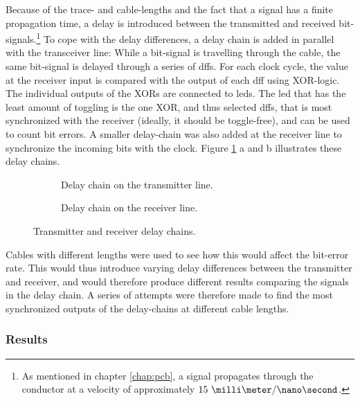 \documentclass[main.tex]{subfiles}
\begin{document}
Because of the trace- and cable-lengths and the fact that a signal has a finite propagation time, a delay is introduced between the transmitted and received bit-signals.\footnote{As mentioned in chapter \ref{chap:pcb}, a signal propagates through the conductor at a velocity of approximately $15\ \milli\meter/\nano\second$.} To cope with the delay differences, a delay chain is added in parallel with the transceiver line: While a bit-signal is travelling through the cable, the same bit-signal is delayed through a series of \glspl{dff}. For each clock cycle, the value at the receiver input is compared with the output of each \gls{dff} using XOR-logic. The individual outputs of the XORs are connected to \glspl{led}. The \gls{led} that has the least amount of toggling is the one XOR, and thus selected \glspl{dff}, that is most synchronized with the receiver (ideally, it should be toggle-free), and can be used to count bit errors. A smaller delay-chain was also added at the receiver line to synchronize the incoming bits with the clock. Figure \ref{fig:delaych} a and b illustrates these delay chains.

\begin{figure}
    \centering
    \begin{subfigure}{\textwidth}
        \centering
        \resizebox{1\linewidth}{!}{}
        \caption{Delay chain on the transmitter line.}
    \end{subfigure}

    \begin{subfigure}{0.6\textwidth}
        \centering
        \resizebox{1\linewidth}{!}{}
        \caption{Delay chain on the receiver line.}
    \end{subfigure}
    \caption{Transmitter and receiver delay chains.}
    \label{fig:delaych}
\end{figure}

Cables with different lengths were used to see how this would affect the bit-error rate. This would thus introduce varying delay differences between the transmitter and receiver, and would therefore produce different results comparing the signals in the delay chain. A series of attempts were therefore made to find the most synchronized outputs of the delay-chains at different cable lengths. 


\subsubsection{Results}
\end{document}
